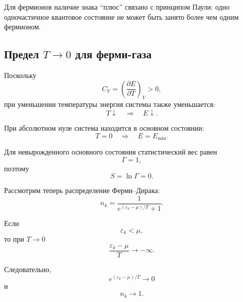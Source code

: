 \documentclass[../final.tex]{subfiles}
\begin{document}
Для фермионов наличие знака ``плюс'' связано с принципом Паули:
одно одночастичное квантовое состояние не может быть занято
более чем одним фермионом.



\subsection*{Предел $T\to 0$ для ферми-газа}

Поскольку
%
\begin{equation*}
    C_V
    =
    \left(
        \frac{\partial E}{\partial T}
    \right)_V
    >0,
\end{equation*}
%
при уменьшении температуры энергия системы также уменьшается:
%
\begin{equation*}
    T\downarrow
    \quad\Longrightarrow\quad
    E\downarrow.
\end{equation*}

При абсолютном нуле система находится в основном состоянии:
%
\begin{equation*}
    T=0
    \quad\Longrightarrow\quad
    E=E_{\min}.
\end{equation*}

Для невырожденного основного состояния статистический вес равен
%
\begin{equation*}
    \Gamma=1,
\end{equation*}
%
поэтому
%
\begin{equation*}
    S
    =
    \ln\Gamma
    =
    0.
\end{equation*}


Рассмотрим теперь распределение Ферми--Дирака:
%
\begin{equation*}
    n_k
    =
    \frac{
        1
    }{
        e^{(\varepsilon_k-\mu)/T}+1
    }.
\end{equation*}

Если
%
\begin{equation*}
    \varepsilon_k<\mu,
\end{equation*}
%
то при $T\to0$
%
\begin{equation*}
    \frac{
        \varepsilon_k-\mu
    }{
        T
    }
    \to
    -\infty.
\end{equation*}

Следовательно,
%
\begin{equation*}
    e^{(\varepsilon_k-\mu)/T}
    \to
    0
\end{equation*}
%
и
%
\begin{equation*}
    n_k
    \to
    1.
\end{equation*}
\end{document}
